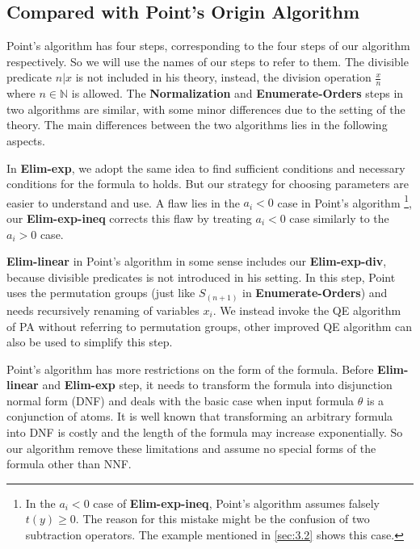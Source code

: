 {\subsection{Compared with Point's Origin Algorithm}

Point's algorithm \cite{Point86} has four steps,
corresponding to the four steps of our algorithm respectively.
So we will use the names of our steps to refer to them. 
The divisible predicate $n|x$ is not included in his theory,
instead, the division operation $\frac{x}{n}$ where $n\in \mathbb{N}$ is allowed.
The \textbf{Normalization} and \textbf{Enumerate-Orders} steps in two algorithms are similar,
with some minor differences due to the setting of the theory.
The main differences between the two algorithms lies in the following aspects.

In \textbf{Elim-exp},
we adopt the same idea to find sufficient conditions
and necessary conditions for the formula to holds.
But our strategy for choosing parameters are easier to understand and use.
A flaw lies in the $a_i<0$ case in Point's algorithm 
\footnote{
In the $a_i<0$ case of \textbf{Elim-exp-ineq},
Point's algorithm assumes falsely $t(y)\ge 0$.
The reason for this mistake might be the confusion of 
two subtraction operators.
The example mentioned in \ref{sec:3.2} shows this case.
},
our \textbf{Elim-exp-ineq} corrects this flaw by 
treating $a_i<0$ case similarly to the $a_i>0$ case.

\textbf{Elim-linear} in Point's algorithm in some sense includes our
\textbf{Elim-exp-div}, because divisible predicates is not introduced in his setting.
In this step,
Point uses the permutation groups (just like $S_{(n+1)}$ in \textbf{Enumerate-Orders}) and needs recursively renaming of variables $x_i$.
We instead invoke the QE algorithm of PA without referring to permutation groups, 
other improved QE algorithm can also be used to simplify this step.

Point's algorithm has more restrictions on the form
of the formula.
Before \textbf{Elim-linear} and \textbf{Elim-exp} step,
it needs to transform the formula into disjunction normal form (DNF)
and deals with the basic case when input formula $\theta$ is 
a conjunction of atoms. 
It is well known that transforming an arbitrary formula into 
DNF is costly and the length of the formula may increase exponentially.
So our algorithm remove these limitations and assume no special forms of
the formula other than NNF.
}


